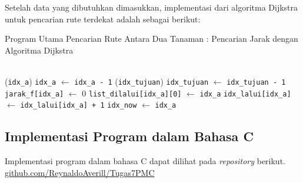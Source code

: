 \documentclass[conference]{IEEEtran}
\begin{document}
Setelah data yang dibutuhkan dimasukkan, implementasi dari algoritma Dijkstra untuk pencarian rute terdekat adalah sebagai berikut:
\begin{algorithm}
    \caption{Program Utama Pencarian Rute Antara Dua Tanaman : Pencarian Jarak dengan Algoritma Dijkstra}
     \\
    (\texttt{idx\_a})\;
    \texttt{idx\_a} $\leftarrow$ \texttt{idx\_a - 1}\;
    (\texttt{idx\_tujuan})\;
    \texttt{idx\_tujuan} $\leftarrow$ \texttt{idx\_tujuan - 1}\;
    \texttt{jarak\_f[idx\_a]} $\leftarrow$ 0\;
    \texttt{list\_dilalui[idx\_a][0]} $\leftarrow$ \texttt{idx\_a}\;
    \texttt{idx\_lalui[idx\_a]} $\leftarrow$ \texttt{idx\_lalui[idx\_a] + 1}\;
    \texttt{idx\_now} $\leftarrow$ \texttt{idx\_a}\;
\end{algorithm}

\subsection{Implementasi Program dalam Bahasa C}
Implementasi program dalam bahasa C dapat dilihat pada \textit{repository} berikut.
\href{https://github.com/ReynaldoAverill/Tugas7PMC}{github.com/ReynaldoAverill/Tugas7PMC}
\end{document}
